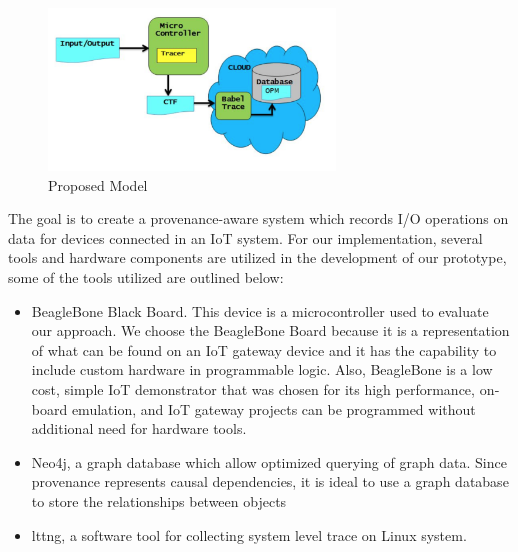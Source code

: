 \begin{figure}[h]
\begin{center}

\includegraphics[width =3.0in]{architecture.PNG}    
\end{center}
\caption{Proposed Model}
\label{architecture}
\end{figure}

The goal is to create a provenance-aware system which records I/O operations on data for devices connected in an IoT system. For our implementation, several tools and hardware components are utilized in the development of our prototype, some of the tools utilized are outlined below:

\begin{itemize}
\item BeagleBone Black Board. This device is a microcontroller used to evaluate our approach. We choose the BeagleBone Board because it is a representation of what can be found on an IoT gateway device and it has the capability to include custom hardware in programmable logic. Also, BeagleBone is a low cost, simple IoT demonstrator that was chosen for its high performance, on­board emulation, and IoT gateway projects can be programmed without additional need for hardware tools.


\item Neo4j, a graph database which allow optimized querying of graph data. Since provenance represents causal dependencies, it is ideal to use a graph database to store the relationships between objects

\item lttng, a software tool for collecting system level trace on Linux system. 

\end{itemize}




